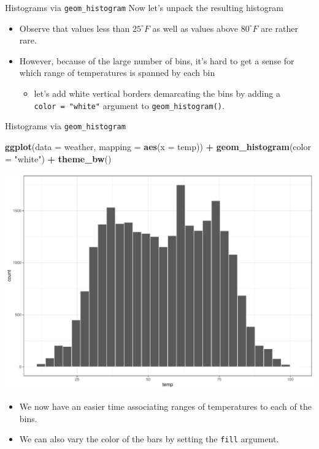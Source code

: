 \documentclass[
  ignorenonframetext,
]{beamer}
\newenvironment{Shaded}{\begin{snugshade}}{\end{snugshade}}
\newcommand{\AttributeTok}[1]{\textcolor[rgb]{0.13,0.29,0.53}{#1}}
\newcommand{\FunctionTok}[1]{\textcolor[rgb]{0.13,0.29,0.53}{\textbf{#1}}}
\newcommand{\NormalTok}[1]{#1}
\newcommand{\SpecialCharTok}[1]{\textcolor[rgb]{0.81,0.36,0.00}{\textbf{#1}}}
\newcommand{\StringTok}[1]{\textcolor[rgb]{0.31,0.60,0.02}{#1}}
\providecommand{\tightlist}{%
  \setlength{\itemsep}{0pt}\setlength{\parskip}{0pt}}
\begin{document}
\begin{frame}[fragile]{Histograms via \texttt{geom\_histogram}}
\protect\hypertarget{histograms-via-geom_histogram-1}{}
Now let's unpack the resulting histogram

\begin{itemize}
\item
  Observe that values less than \(25^{\circ}F\) as well as values above
  \(80^{\circ}F\) are rather rare.
\item
  However, because of the large number of bins, it's hard to get a sense
  for which range of temperatures is spanned by each bin

  \begin{itemize}
  \tightlist
  \item
    let's add white vertical borders demarcating the bins by adding a
    \texttt{color\ =\ "white"} argument to \texttt{geom\_histogram()}.
  \end{itemize}
\end{itemize}
\end{frame}

\begin{frame}[fragile]{Histograms via \texttt{geom\_histogram}}
\protect\hypertarget{histograms-via-geom_histogram-2}{}
\tiny

\begin{Shaded}
\begin{Highlighting}[]
\FunctionTok{ggplot}\NormalTok{(}\AttributeTok{data =}\NormalTok{ weather, }\AttributeTok{mapping =} \FunctionTok{aes}\NormalTok{(}\AttributeTok{x =}\NormalTok{ temp)) }\SpecialCharTok{+}
  \FunctionTok{geom\_histogram}\NormalTok{(}\AttributeTok{color =} \StringTok{"white"}\NormalTok{) }\SpecialCharTok{+} 
  \FunctionTok{theme\_bw}\NormalTok{()}
\end{Highlighting}
\end{Shaded}

\begin{center}\includegraphics[width=0.7\linewidth,height=0.5\textheight]{Week2_Lect_files/figure-beamer/unnamed-chunk-26-1} \end{center}
\normalsize

\begin{itemize}
\item
  We now have an easier time associating ranges of temperatures to each
  of the bins.
\item
  We can also vary the color of the bars by setting the \texttt{fill}
  argument.
\end{itemize}
\end{frame}
\end{document}
